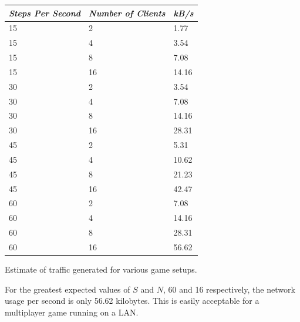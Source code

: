 \begin{margintable}
    \begin{tabular}{p{5em} p{5em} p{5em}}
    \toprule
    \emph{Steps Per Second} & \emph{Number of Clients} & \emph{kB/s} \\
    \midrule
    15 & 2 & 1.77 \\
    15 & 4 & 3.54 \\
    15 & 8 & 7.08 \\
    15 & 16 & 14.16 \\
    30 & 2 & 3.54 \\
    30 & 4 & 7.08 \\
    30 & 8 & 14.16 \\
    30 & 16 & 28.31 \\
    45 & 2 & 5.31 \\
    45 & 4 & 10.62 \\
    45 & 8 & 21.23 \\
    45 & 16 & 42.47 \\
    60 & 2 & 7.08 \\
    60 & 4 & 14.16 \\
    60 & 8 & 28.31 \\
    60 & 16 & 56.62 \\
    \bottomrule
    \end{tabular}
    	\vspace{1em}
	\caption[Estimation of network requirements]{
	Estimate of traffic generated for various game setups.}
	\label{tab:networkRequirements}
\end{margintable}

For the greatest expected values of $S$ and $N$, 60 and 16 respectively, the network usage per second is only 56.62 kilobytes. This is easily acceptable for a multiplayer game running on a LAN.



